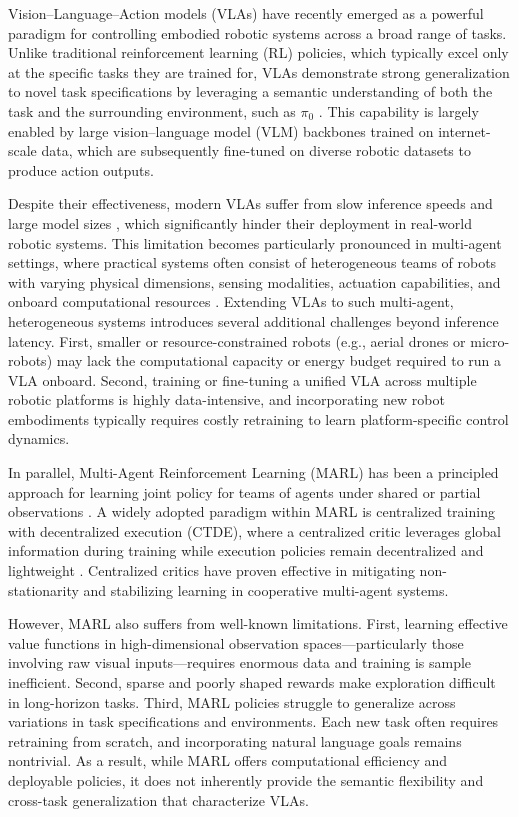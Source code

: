 \documentclass[letterpaper, 10 pt, conference]{ieeeconf}  %
\begin{document}
Vision–Language–Action models (VLAs) have recently emerged as a powerful paradigm for controlling embodied robotic systems across a broad range of tasks. Unlike traditional reinforcement learning (RL) policies, which typically excel only at the specific tasks they are trained for, VLAs demonstrate strong generalization to novel task specifications by leveraging a semantic understanding of both the task and the surrounding environment, such as $\pi_0$ \cite{intelligence2025pi_}. This capability is largely enabled by large vision–language model (VLM) backbones trained on internet-scale data, which are subsequently fine-tuned on diverse robotic datasets to produce action outputs.

Despite their effectiveness, modern VLAs suffer from slow inference speeds and large model sizes \cite{kim24openvla}, which significantly hinder their deployment in real-world robotic systems. This limitation becomes particularly pronounced in multi-agent settings, where practical systems often consist of heterogeneous teams of robots with varying physical dimensions, sensing modalities, actuation capabilities, and onboard computational resources \cite{ramachandran2021resilient}. Extending VLAs to such multi-agent, heterogeneous systems introduces several additional challenges beyond inference latency. First, smaller or resource-constrained robots (e.g., aerial drones or micro-robots) may lack the computational capacity or energy budget required to run a VLA onboard. Second, training or fine-tuning a unified VLA across multiple robotic platforms is highly data-intensive, and incorporating new robot embodiments typically requires costly retraining to learn platform-specific control dynamics.


In parallel, Multi-Agent Reinforcement Learning (MARL) has been  a principled approach for learning joint policy for  teams of agents under shared or partial observations \cite{lowe2017multi}. A widely adopted paradigm within MARL is centralized training with decentralized execution (CTDE), where a centralized critic leverages global information during training while execution policies remain decentralized and lightweight \cite{lowe2017multi, yu2021surprising}. Centralized critics have proven effective in mitigating non-stationarity and stabilizing learning in cooperative multi-agent systems.

However, MARL also suffers from well-known limitations. First, learning effective value functions in high-dimensional observation spaces—particularly those involving raw visual inputs—requires enormous data and training is sample inefficient. Second, sparse and poorly shaped rewards make exploration difficult in long-horizon tasks. Third, MARL policies  struggle to generalize across variations in task specifications and environments. Each new task often requires retraining from scratch, and incorporating natural language goals remains nontrivial. As a result, while MARL offers computational efficiency and deployable policies, it does not inherently provide the semantic flexibility and cross-task generalization that characterize VLAs.
\end{document}
